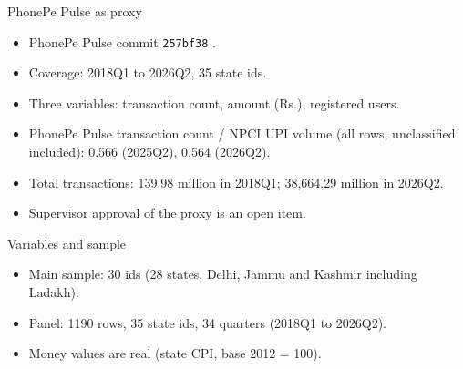\documentclass[aspectratio=169,11pt]{beamer}
\begin{document}
\begin{frame}{PhonePe Pulse as proxy}
\begin{itemize}
\item PhonePe Pulse commit \texttt{257bf38} \citep{phonepe_pulse}. %
\item Coverage: 2018Q1 to 2026Q2, 35 state ids. %
\item Three variables: transaction count, amount (Rs.), registered users. %
\item PhonePe Pulse transaction count / NPCI UPI volume (all rows, unclassified included): 0.566 (2025Q2), 0.564 (2026Q2).
\item Total transactions: 139.98 million in 2018Q1; 38,664.29 million in 2026Q2. %
\item Supervisor approval of the proxy is an open item. %
\end{itemize}
\end{frame}

\begin{frame}{Variables and sample}
\begin{itemize}
\item Main sample: 30 ids (28 states, Delhi, Jammu and Kashmir including Ladakh). %
\item Panel: 1190 rows, 35 state ids, 34 quarters (2018Q1 to 2026Q2). %
\item Money values are real (state CPI, base 2012 = 100). %
\end{itemize}
\vspace{0.5em}
\begin{center}
\footnotesize
\resizebox{0.95\textwidth}{!}{}
\end{center}
\end{frame}
\end{document}
